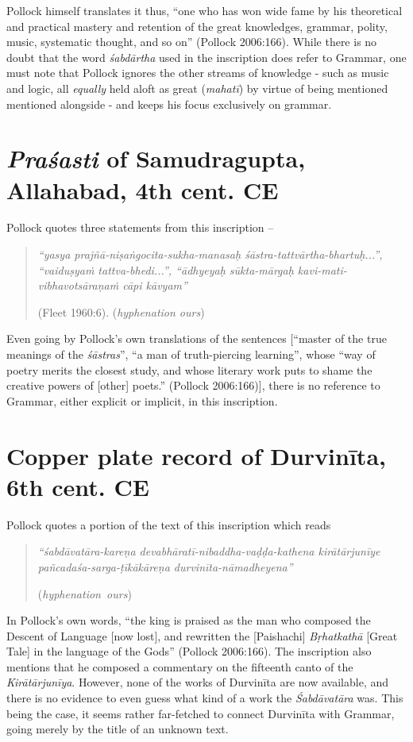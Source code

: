 Pollock himself translates it thus, ``one who has won wide fame by his theoretical and practical mastery and retention of the great knowledges, grammar, polity, music, systematic thought, and so on'' (Pollock 2006:166). While there is no doubt that the word {\sl śabdārtha} used in the inscription does refer to Grammar, one must note that Pollock ignores the other streams of knowledge - such as music and logic, all {\sl equally} held aloft as great ({\sl mahatī}) by virtue of being mentioned mentioned alongside - and keeps his focus exclusively on grammar. 

\section{{\sl\bfseries Praśasti} of Samudragupta, Allahabad, 4th cent. CE}\label{chap3-sec2}

Pollock quotes three statements from this inscription -- 
\begin{quote}
{{\sl ``yasya prajñā-niṣaṅgocita-sukha-manasaḥ śāstra-tattvārtha-bhartuḥ...'', ``vai\-duṣyaṁ tattva-bhedi...'', ``ādhyeyaḥ sūkta-mārgaḥ kavi-mati-vibhavotsāraṇaṁ cāpi kāvyam''}}

\hfill (Fleet 1960:6). ({\sl hyphenation ours}) 
\end{quote}

Even going by Pollock's own translations of the sentences [``master of the true meanings of the {\sl śāstras}'', ``a man of truth-piercing learning'', whose ``way of poetry merits the closest study, and whose literary work puts to shame the creative powers of [other] poets.'' (Pollock 2006:166)], there is no reference to Grammar, either explicit or implicit, in this inscription.

\section{Copper plate record of Durvinīta, 6th cent. CE}\label{chap3-sec3}

Pollock quotes a portion of the text of this inscription which reads 
\begin{quote}
{{\sl ``śabdāvatāra-kareṇa devabhāratī-nibaddha-vaḍḍa-kathena kirātārjunīye pañ\-ca\-daśa-sarga-ṭīkākāreṇa durvinīta-nāmadheyena''}} 

\hfill \hbox{({\sl hyphenation ours})}
\end{quote}

In Pollock's own words, ``the king is praised as the man who composed the Descent of Language [now lost], and rewritten the [Paishachi] {\sl Bṛhatkathā} [Great Tale] in the language of the Gods'' (Pollock 2006:166). The inscription also mentions that he composed a commentary on the fifteenth canto of the {\sl Kirātārjunīya}. However, none of the works of Durvinīta are now available, and there is no evidence to even guess what kind of a work the {\sl Śabdāvatāra} was. This being the case, it seems rather far-fetched to connect Durvinīta with Grammar, going merely by the title of an unknown text. 

